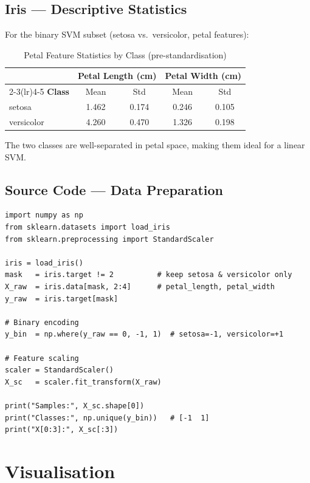 \documentclass[12pt,a4paper]{article}
\begin{document}
\subsection{Iris — Descriptive Statistics}

For the binary SVM subset (setosa vs.\ versicolor, petal features):

\begin{table}[H]
\centering
\caption{Petal Feature Statistics by Class (pre-standardisation)}
\begin{tabular}{l cc cc}
\toprule
& \multicolumn{2}{c}{\textbf{Petal Length (cm)}} & \multicolumn{2}{c}{\textbf{Petal Width (cm)}} \\
\cmidrule(lr){2-3}\cmidrule(lr){4-5}
\textbf{Class} & Mean & Std & Mean & Std \\ \midrule
setosa     & 1.462 & 0.174 & 0.246 & 0.105 \\
versicolor & 4.260 & 0.470 & 1.326 & 0.198 \\ \bottomrule
\end{tabular}
\end{table}

The two classes are well-separated in petal space, making them ideal for a linear SVM.

\subsection{Source Code — Data Preparation}

\begin{lstlisting}[caption={Data loading and preprocessing for SVM}]
import numpy as np
from sklearn.datasets import load_iris
from sklearn.preprocessing import StandardScaler

iris = load_iris()
mask   = iris.target != 2          # keep setosa & versicolor only
X_raw  = iris.data[mask, 2:4]      # petal_length, petal_width
y_raw  = iris.target[mask]

# Binary encoding
y_bin  = np.where(y_raw == 0, -1, 1)  # setosa=-1, versicolor=+1

# Feature scaling
scaler = StandardScaler()
X_sc   = scaler.fit_transform(X_raw)

print("Samples:", X_sc.shape[0])
print("Classes:", np.unique(y_bin))   # [-1  1]
print("X[0:3]:", X_sc[:3])
\end{lstlisting}

\section{Visualisation}
\end{document}

